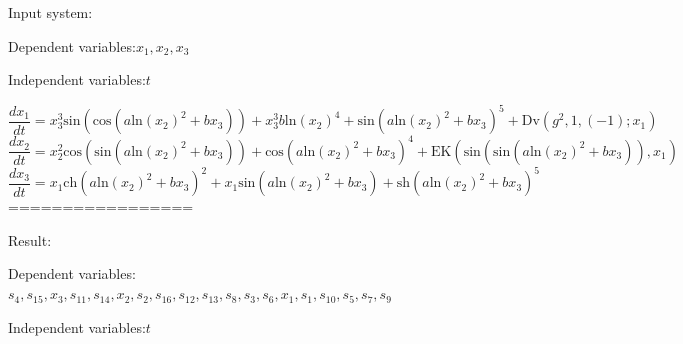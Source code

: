 \documentclass[10pt,a4paper]{article}
\begin{document}
Input system:

Dependent variables:$x_{1}, x_{2}, x_{3}$

Independent variables:$t$

\begin{equation}\frac{dx_{1}}{dt} = x_{3} ^ {3}  \text{sin}(\text{cos}(a  \text{ln}(x_{2}) ^ {2} + b  x_{3})) + x_{3} ^ {3}  b  \text{ln}(x_{2}) ^ {4} + \text{sin}(a  \text{ln}(x_{2}) ^ {2} + b  x_{3}) ^ {5} + \text{Dv}(g ^ {2}, 1, (-1); x_{1})\end{equation}
\begin{equation}\frac{dx_{2}}{dt} = x_{2} ^ {2}  \text{cos}(\text{sin}(a  \text{ln}(x_{2}) ^ {2} + b  x_{3})) + \text{cos}(a  \text{ln}(x_{2}) ^ {2} + b  x_{3}) ^ {4} + \text{EK}(\text{sin}(\text{sin}(a  \text{ln}(x_{2}) ^ {2} + b  x_{3})), x_{1})\end{equation}
\begin{equation}\frac{dx_{3}}{dt} = x_{1}  \text{ch}(a  \text{ln}(x_{2}) ^ {2} + b  x_{3}) ^ {2} + x_{1}  \text{sin}(a  \text{ln}(x_{2}) ^ {2} + b  x_{3}) + \text{sh}(a  \text{ln}(x_{2}) ^ {2} + b  x_{3}) ^ {5}\end{equation}
=================

Result:

Dependent variables:$s_{4}, s_{15}, x_{3}, s_{11}, s_{14}, x_{2}, s_{2}, s_{16}, s_{12}, s_{13}, s_{8}, s_{3}, s_{6}, x_{1}, s_{1}, s_{10}, s_{5}, s_{7}, s_{9}$

Independent variables:$t$
\end{document}
